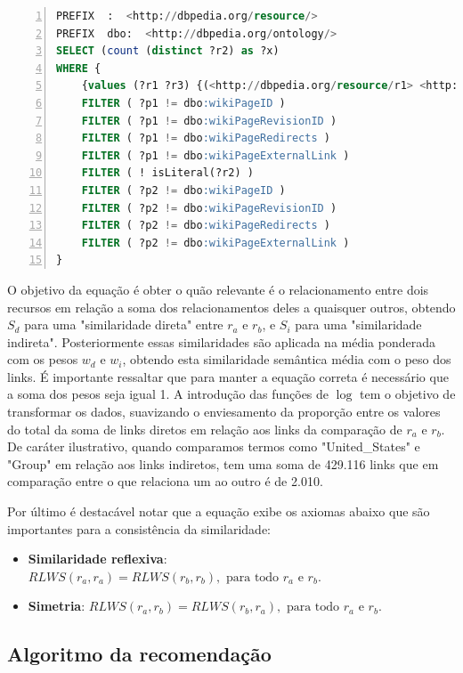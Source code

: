 \begin{lstlisting}[caption=Consulta SPARQL para contagem de links indiretos (saíntes) entre dois recursos., language=SQL, frame=single, label={cod:sparql_cio}, float, numbers=left]
PREFIX  :  <http://dbpedia.org/resource/>
PREFIX  dbo:  <http://dbpedia.org/ontology/>
SELECT (count (distinct ?r2) as ?x)
WHERE {
	{values (?r1 ?r3) {(<http://dbpedia.org/resource/r1> <http://dbpedia.org/resource/r2>)} ?r2 ?p1 ?r1 . ?r2 ?p2 ?r3 . FILTER (?r1 != ?r3 && ?r2 != ?r1 && ?r2 != ?r3)}
	FILTER ( ?p1 != dbo:wikiPageID )
	FILTER ( ?p1 != dbo:wikiPageRevisionID )
	FILTER ( ?p1 != dbo:wikiPageRedirects )
	FILTER ( ?p1 != dbo:wikiPageExternalLink )
	FILTER ( ! isLiteral(?r2) )
	FILTER ( ?p2 != dbo:wikiPageID )
	FILTER ( ?p2 != dbo:wikiPageRevisionID )
	FILTER ( ?p2 != dbo:wikiPageRedirects )
	FILTER ( ?p2 != dbo:wikiPageExternalLink )
}
\end{lstlisting}

O objetivo da equação é obter o quão relevante é o relacionamento entre dois recursos em relação a soma dos relacionamentos deles a quaisquer outros, obtendo $S_d$ para uma "similaridade direta" entre $r_a$ e $r_b$, e $S_i$ para uma "similaridade indireta". Posteriormente essas similaridades são aplicada na média ponderada com os pesos $w_d$ e $w_i$, obtendo esta similaridade semântica média com o peso dos links. É importante ressaltar que para manter a equação correta é necessário que a soma dos pesos seja igual 1. A introdução das funções de $\log$ tem o objetivo de transformar os dados, suavizando o enviesamento da proporção entre os valores do total da soma de links diretos em relação aos links da comparação de $r_a$ e $r_b$. De caráter ilustrativo, quando comparamos termos como "United\_States" e "Group" em relação aos links indiretos, tem uma soma de 429.116 links que em comparação entre o que relaciona um ao outro é de 2.010.

Por último é destacável notar que a equação exibe os axiomas abaixo que são importantes para a consistência da similaridade:

\begin{itemize}
	\item{\textbf{Similaridade reflexiva}: $RLWS(r_a, r_a) = RLWS(r_b, r_b), \text{ para todo } r_a \text{ e } r_b$.}
	\item{\textbf{Simetria}: $RLWS(r_a, r_b) = RLWS(r_b, r_a), \text{ para todo } r_a \text{ e } r_b$.}
\end{itemize}

\subsection{Algoritmo da recomendação}
\label{ssec:rec_alg}

